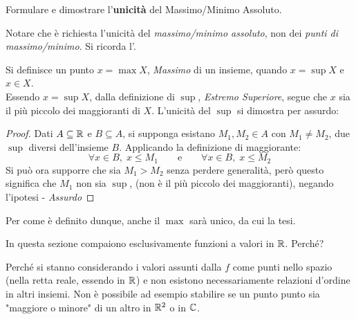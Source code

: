 \begin{exercise}
	\label{ex:uniq_max_min_abs}
	Formulare e dimostrare l'\textbf{unicità} del Massimo/Minimo Assoluto.
	\begin{note}
		Notare che è richiesta l'unicità del \textit{massimo/minimo assoluto}, non dei \textit{punti di massimo/minimo}. Si ricorda l'.
	\end{note}
	\begin{solution}
		Si definisce un punto $x = \max X$, \textit{Massimo} di un insieme, quando $x = \sup X$ e $x \in X$.\\
		Essendo $x = \sup X$, dalla definizione di $\sup$, \textit{Estremo Superiore}, segue che $x$ sia il più piccolo dei maggioranti di $X$. L'unicità del $\sup$ si dimostra per assurdo:
		\begin{proof}
			\renewcommand\qedsymbol{$\square$} %
			Dati $A \subseteq \mathbb{R}$ e $B \subseteq A$, si supponga esistano $M_1, M_2 \in A$ con $M_1 \neq M_2$, due $\sup$ diversi dell'insieme $B$. Applicando la definizione di maggiorante:
			\[\forall x \in B,\; x \leq M_1 \qquad \text{e} \qquad \forall x \in B,\; x \leq M_2\]
			Si può ora supporre che sia $M_1 > M_2$ senza perdere generalità, però questo significa che $M_1$ non sia $\sup$, (non è il più piccolo dei maggioranti), negando l'ipotesi - \textit{Assurdo}
		\end{proof}
		Per come è definito dunque, anche il $\max$ sarà unico, da cui la tesi.
	\end{solution}
\end{exercise}
\begin{exercise}
	\label{ex:max_min_lib_funz_in_R}
	In questa sezione compaiono esclusivamente funzioni a valori in $\mathbb{R}$. Perché?
	\begin{solution}
		Perché si stanno considerando i valori assunti dalla $f$ come punti nello spazio (nella retta reale, essendo in $\mathbb{R}$) e non esistono necessariamente relazioni d'ordine in altri insiemi. Non è possibile ad esempio stabilire se un punto punto sia "maggiore o minore" di un altro in $\mathbb{R}^2$ o in $\mathbb{C}$.
	\end{solution}
\end{exercise}


